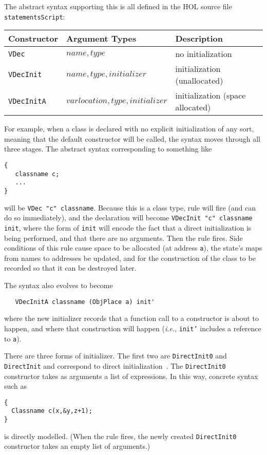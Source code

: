 \documentclass[11pt]{article}
\newcommand{\ie}{\emph{i.e.}}
\begin{document}
The abstract syntax supporting this is all defined in the HOL source
file \texttt{statementsScript}:

\begin{center}
\begin{tabular}{lll}
Constructor & Argument Types & Description\\
\hline
\texttt{VDec} & $\mathit{name},\mathit{type}$ & no initialization\\
\texttt{VDecInit} &
$\mathit{name},\mathit{type},\mathit{initializer}$ &
initialization (unallocated) \\
\texttt{VDecInitA} &
$\mathit{varlocation},\mathit{type},\mathit{initializer}$ &
initialization (space allocated)
\end{tabular}
\end{center}

For example, when a class is declared with no explicit initialization
of any sort, meaning that the default constructor will be called, the
syntax moves through all three stages.  The abstract syntax
corresponding to something like
\begin{verbatim}
{
   classname c;
   ...
}
\end{verbatim}
will be \texttt{VDec "c" classname}.  Because this is a class type,
rule  will fire (and can do so immediately),
and the declaration will become \texttt{VDecInit "c" classname init},
where the form of \texttt{init} will encode the fact that a direct
initialization is being performed, and that there are no arguments.
Then the rule 
fires.  Side conditions of this rule cause space to be allocated (at
address \texttt{a}), the state's maps from names to addresses be
updated, and for the construction of the class to be recorded so that
it can be destroyed later.

The syntax also evolves to become
\begin{verbatim}
   VDecInitA classname (ObjPlace a) init'
\end{verbatim}
where the new initializer records that a function call to a
constructor is about to happen, and where that construction will
happen (\ie, \texttt{init'} includes a reference to \texttt{a}).

There are three forms of initializer.  The first two are
\texttt{DirectInit0} and \texttt{DirectInit} and correspond to direct
initialization~\cite[\S 8.5 paragraph 12]{cpp-standard-iso14882}.  The
\texttt{DirectInit0} constructor takes as arguments a list of
expressions.  In this way, concrete syntax such as
\begin{verbatim}
{
  Classname c(x,&y,z+1);
}
\end{verbatim}
is directly modelled.  (When the rule  fires,
the newly created \texttt{DirectInit0} constructor takes an empty list
of arguments.)
\end{document}
